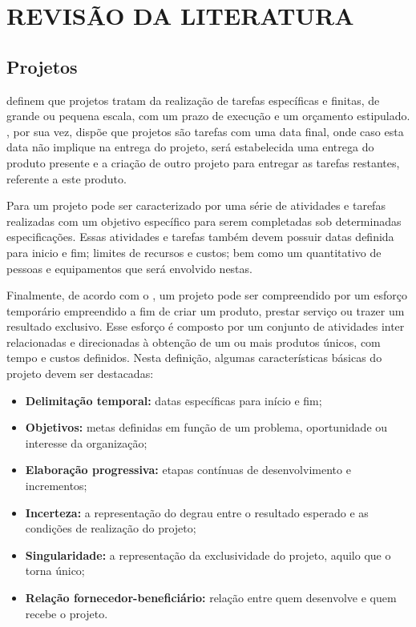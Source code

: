 \chapter{REVISÃO DA LITERATURA}
\thispagestyle{empty}

\section{Projetos}

 definem que projetos tratam da realização de tarefas específicas e finitas, de grande ou pequena escala, com um prazo de execução e um orçamento estipulado. , por sua vez, dispõe que projetos são tarefas com uma data final, onde caso esta data não implique na entrega do projeto, será estabelecida uma entrega do produto presente e a criação de outro projeto para entregar as tarefas restantes, referente a este produto.

Para  um projeto pode ser caracterizado por uma série de atividades e tarefas realizadas com um objetivo específico para serem completadas sob determinadas especificações. Essas atividades e tarefas também devem possuir datas definida para inicio e fim; limites de recursos e custos; bem como um quantitativo de pessoas e equipamentos que será envolvido nestas.

Finalmente, de acordo com o , um projeto pode ser compreendido por um esforço temporário empreendido a fim de criar um produto, prestar serviço ou trazer um resultado exclusivo. Esse esforço é composto por um conjunto de atividades inter relacionadas e direcionadas à obtenção de um ou mais produtos únicos, com tempo e custos definidos. Nesta definição, algumas características básicas do projeto devem ser destacadas:

\begin{itemize}
  \item{\textbf{Delimitação temporal:} datas específicas para início e fim;}
  \item{\textbf{Objetivos:} metas definidas em função de um problema, oportunidade ou interesse da organização;}
  \item{\textbf{Elaboração progressiva:} etapas contínuas de desenvolvimento e incrementos;}
  \item{\textbf{Incerteza:} a representação do degrau entre o resultado esperado e as condições de realização do projeto;}
  \item{\textbf{Singularidade:} a representação da exclusividade do projeto, aquilo que o torna único;}
  \item{\textbf{Relação fornecedor-beneficiário:} relação entre quem desenvolve e quem recebe o projeto.}
\end{itemize}

